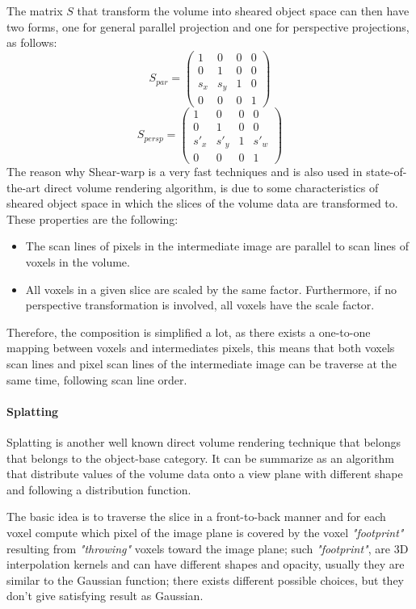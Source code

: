 \documentclass[12pt,a4paper]{extarticle}
\newcommand{\linespace}{\vspace{8pt}}
\begin{document}
The matrix $S$ that transform the volume into sheared object space can then have two forms, one for general parallel projection and one for perspective projections, as follows: 
\[
S_{par}
=
\begin{pmatrix}
1 & 0 & 0 & 0\\
0 & 1 & 0 & 0\\
s_{x}&s_{y}& 1 & 0\\
0& 0 &0 &1
\end{pmatrix}
\]
\[
S_{persp}
=
\begin{pmatrix}
1 & 0 & 0 & 0\\
0 & 1 & 0 & 0\\
s'_{x}&s'_{y}& 1 & s'_{w}\\
0& 0 &0 &1
\end{pmatrix}
\]
The reason why Shear-warp is a very fast techniques and is also used in state-of-the-art direct volume rendering algorithm, is due to some characteristics of sheared object space in which the slices of the volume data are transformed to.
These properties are the following:
\begin{itemize}
\item The scan lines %
of pixels in the intermediate image are parallel to scan lines of voxels in the volume.
\item All voxels in a given slice are scaled by the same factor. Furthermore, if no perspective transformation is involved, all voxels have the scale factor.
\end{itemize}
Therefore, the composition is simplified a lot, as there exists a one-to-one mapping between voxels and intermediates pixels, this means that both voxels scan lines and pixel scan lines of the intermediate image can be traverse at the same time, following scan line order.

\paragraph{Splatting} Splatting is another well known direct volume rendering technique that belongs that belongs to the object-base category. It can be summarize as an algorithm that distribute values of the volume data onto a view plane with different shape and following a distribution function.
\linespace

The basic idea is to traverse the slice in a front-to-back manner and for each voxel compute which pixel of the image plane is covered by the voxel \textit{"footprint"} resulting from \textit{"throwing"} voxels toward the image plane; such \textit{"footprint"}, are 3D interpolation kernels %
and can have different shapes and opacity, usually they are similar to the Gaussian function; there exists different possible choices, but they don't give satisfying result as Gaussian.
\end{document}

